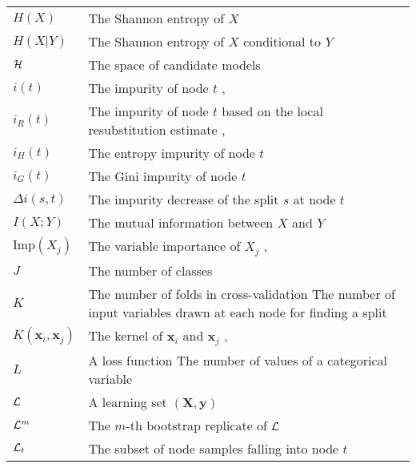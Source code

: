 \begin{tabularx}{\textwidth}{ l X }
$H(X)$ & The Shannon entropy of $X$ \dotfill  \pageref{eqn:6:entropy}\\
$H(X|Y)$ & The Shannon entropy of $X$ conditional to $Y$\dotfill  \pageref{eqn:6:entropy-cond}\\
${\cal H}$ & The space of candidate models \dotfill  \pageref{ntn:H}\\
$i(t)$ & The impurity of node $t$ \dotfill  \pageref{ntn:i_t}, \pageref{ntn:i_t2}\\
$i_R(t)$ & The impurity of node $t$ based on the local resubstitution estimate \dotfill \pageref{eqn:impurity:error},~\pageref{eqn:impurity:variance}\\
$i_H(t)$ & The entropy impurity of node $t$ \dotfill  \pageref{eqn:impurity:shannon}\\
$i_G(t)$ & The Gini impurity of node $t$ \dotfill  \pageref{eqn:impurity:gini}\\
$\Delta i(s, t)$ & The impurity decrease of the split $s$ at node $t$ \dotfill  \pageref{def:impurity-decrease}\\
$I(X;Y)$ & The mutual information between $X$ and $Y$ \dotfill  \pageref{eqn:6:mi}\\
$\text{Imp}(X_j)$ & The variable importance of $X_j$ \dotfill \pageref{eq:mdi}, \pageref{eq:mda}\\
$J$ & The number of classes \dotfill  \pageref{ntn:J}\\
$K$ & The number of folds in cross-validation \dotfill  \pageref{ntn:K-cv} \newline The number of input variables drawn at each node for finding a split \dotfill \pageref{ntn:K-split} \\
$K(\mathbf{x}_i, \mathbf{x}_j)$ & The kernel of $\mathbf{x}_i$ and $\mathbf{x}_j$ \dotfill \pageref{ntn:kernel}, \pageref{ntn:kernel2}\\
$L$ & A loss function \dotfill  \pageref{ntn:L}\newline The number of values of a categorical variable \dotfill \pageref{ntn:L2}\\
${\cal L}$ & A learning set $(\mathbf{X}, \mathbf{y})$ \dotfill  \pageref{ntn:learning-set}\\
${\cal L}^m$ & The $m$-th bootstrap replicate of ${\cal L}$ \dotfill  \pageref{ntn:L_m}\\
${\cal L}_t$ & The subset of node samples falling into node $t$ \dotfill  \pageref{ntn:L_t}\\

\end{tabularx}
